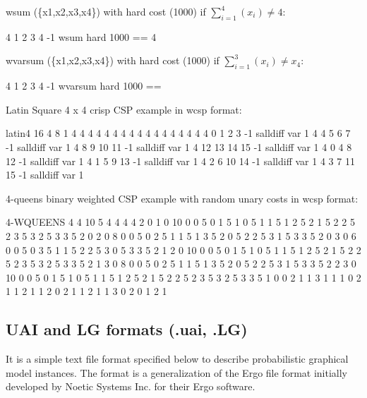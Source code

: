 \documentclass{article}
\begin{document}
\begin{DoxyItemize}
\item wsum (\{x1,x2,x3,x4\}) with hard cost (1000) if $\sum_{i=1}^4(x_i) \neq 4$\-:
\begin{DoxyCode}
4 1 2 3 4 -1 wsum hard 1000 == 4 
\end{DoxyCode}

\item wvarsum (\{x1,x2,x3,x4\}) with hard cost (1000) if $\sum_{i=1}^3(x_i) \neq x_4$\-:
\begin{DoxyCode}
4 1 2 3 4 -1 wvarsum hard 1000 == 
\end{DoxyCode}

\end{DoxyItemize}Latin Square 4 x 4 crisp C\-S\-P example in wcsp format\-: 
\begin{DoxyCode}
latin4 16 4 8 1
4 4 4 4 4 4 4 4 4 4 4 4 4 4 4 4
4 0 1 2 3 -1 salldiff var 1
4 4 5 6 7 -1 salldiff var 1
4 8 9 10 11 -1 salldiff var 1
4 12 13 14 15 -1 salldiff var 1
4 0 4 8 12 -1 salldiff var 1
4 1 5 9 13 -1 salldiff var 1
4 2 6 10 14 -1 salldiff var 1
4 3 7 11 15 -1 salldiff var 1
\end{DoxyCode}


4-\/queens binary weighted C\-S\-P example with random unary costs in wcsp format\-: 
\begin{DoxyCode}
4-WQUEENS 4 4 10 5
4 4 4 4
2 0 1 0 10
0 0 5
0 1 5
1 0 5
1 1 5
1 2 5
2 1 5
2 2 5
2 3 5
3 2 5
3 3 5
2 0 2 0 8
0 0 5
0 2 5
1 1 5
1 3 5
2 0 5
2 2 5
3 1 5
3 3 5
2 0 3 0 6
0 0 5
0 3 5
1 1 5
2 2 5
3 0 5
3 3 5
2 1 2 0 10
0 0 5
0 1 5
1 0 5
1 1 5
1 2 5
2 1 5
2 2 5
2 3 5
3 2 5
3 3 5
2 1 3 0 8
0 0 5
0 2 5
1 1 5
1 3 5
2 0 5
2 2 5
3 1 5
3 3 5
2 2 3 0 10
0 0 5
0 1 5
1 0 5
1 1 5
1 2 5
2 1 5
2 2 5
2 3 5
3 2 5
3 3 5
1 0 0 2
1 1
3 1
1 1 0 2
1 1
2 1
1 2 0 2
1 1
2 1
1 3 0 2
0 1
2 1
\end{DoxyCode}
 

\subsection{UAI and LG formats (.uai, .LG)}

It is a simple text file format specified below to describe probabilistic graphical model instances. The format is a generalization of the Ergo file format initially developed by Noetic Systems Inc. for their Ergo software.
\end{document}
